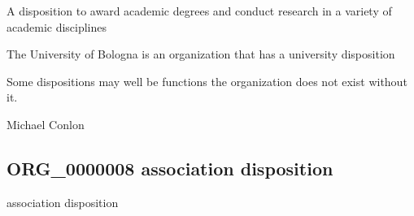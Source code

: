 \documentclass[letterpaper,10pt,english]{sphinxmanual}
\begin{document}
\begin{sphinxShadowBox}

\sphinxAtStartPar
A disposition to award academic degrees and conduct research in a variety of academic disciplines
\end{sphinxShadowBox}

\begin{sphinxShadowBox}

\sphinxAtStartPar
{}
\end{sphinxShadowBox}

\begin{sphinxShadowBox}

\sphinxAtStartPar
The University of Bologna is an organization that has a university disposition
\end{sphinxShadowBox}

\begin{sphinxShadowBox}

\sphinxAtStartPar
Some dispositions may well be functions \textendash{} the organization does not exist without it.
\end{sphinxShadowBox}

\begin{sphinxShadowBox}

\sphinxAtStartPar
Michael Conlon 
\end{sphinxShadowBox}
\begin{quote}

\ignorespaces \end{quote}


\subsection{ORG\_0000008 \sphinxhyphen{} association disposition}
\label{\detokenize{doc-ORG_0000008:org-0000008-association-disposition}}\label{\detokenize{doc-ORG_0000008:index-0}}\label{\detokenize{doc-ORG_0000008::doc}}
\begin{sphinxShadowBox}

\sphinxAtStartPar
association disposition
\end{sphinxShadowBox}
\end{document}
